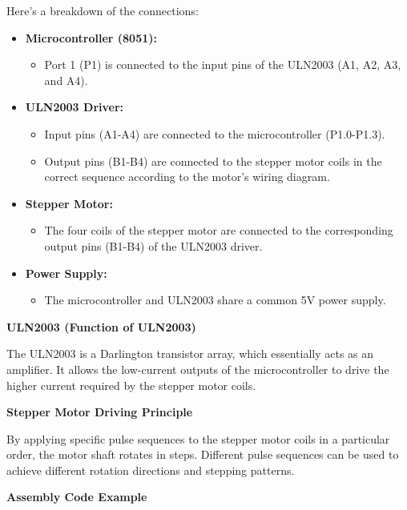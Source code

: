 \documentclass[
]{article}
\begin{document}
Here's a breakdown of the connections:

\begin{itemize}
\item
  \textbf{Microcontroller (8051):}

  \begin{itemize}
  \item
    Port 1 (P1) is connected to the input pins of the ULN2003 (A1, A2,
    A3, and A4).
  \end{itemize}
\item
  \textbf{ULN2003 Driver:}

  \begin{itemize}
  \item
    Input pins (A1-A4) are connected to the microcontroller (P1.0-P1.3).
  \item
    Output pins (B1-B4) are connected to the stepper motor coils in the
    correct sequence according to the motor's wiring diagram.
  \end{itemize}
\item
  \textbf{Stepper Motor:}

  \begin{itemize}
  \item
    The four coils of the stepper motor are connected to the
    corresponding output pins (B1-B4) of the ULN2003 driver.
  \end{itemize}
\item
  \textbf{Power Supply:}

  \begin{itemize}
  \item
    The microcontroller and ULN2003 share a common 5V power supply.
  \end{itemize}
\end{itemize}

\textbf{ULN2003 (Function of ULN2003)}

The ULN2003 is a Darlington transistor array, which essentially acts as
an amplifier. It allows the low-current outputs of the microcontroller
to drive the higher current required by the stepper motor coils.

\textbf{Stepper Motor Driving Principle}

By applying specific pulse sequences to the stepper motor coils in a
particular order, the motor shaft rotates in steps. Different pulse
sequences can be used to achieve different rotation directions and
stepping patterns.

\textbf{Assembly Code Example}
\end{document}
